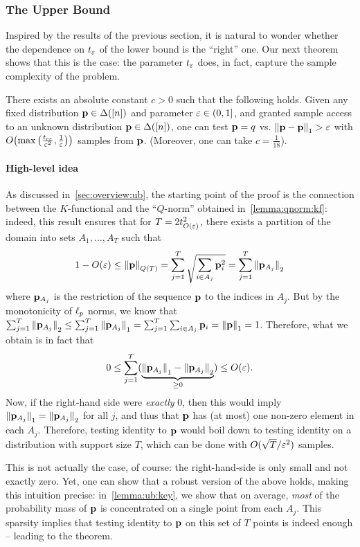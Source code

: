 \subsubsection{The Upper Bound}\label{sec:id:ub}
Inspired by the results of the previous section, it is natural to wonder whether the dependence on $t_\eps$ of the lower bound is the ``right'' one. Our next theorem shows that this is the case: the parameter $t_\eps$ does, in fact, capture the sample complexity of the problem.
\begin{theorem}\label{theo:id:ub}
  There exists an absolute constant $c>0$ such that the following holds. Given any fixed distribution $\p\in\distribs{[n]}$ and parameter $\eps\in(0,1]$, and granted sample access to an unknown distribution $\q\in\distribs{[n]}$, one can test $\p=q$ vs. $\normone{\p-\q} > \eps$ with $\bigO{ \max\left(\frac{t_{c\eps}}{\eps^{2}},\frac{1}{\eps}\right) }$ samples from $\q$. (Moreover, one can take $c=\frac{1}{18}$).
\end{theorem}

\paragraph{High-level idea}
As discussed in~\cref{sec:overview:ub}, the starting point of the proof is the connection between the $K$-functional and the ``$Q$-norm'' obtained in~\cref{lemma:qnorm:kf}: indeed, this result ensures that for $T=2t^2_{O(\eps)}$, there exists a partition of the domain into sets $A_1,\dots,A_T$ such that
\[
      1-O(\eps) \leq \norm{\p}_{Q(T)} = \sum_{j=1}^T \sqrt{ \sum_{i\in A_j} \p_i^2 } = \sum_{j=1}^T \normtwo{ \p_{A_j} }
\]
where $\p_{A_j}$ is the restriction of the sequence $\p$ to the indices in $A_j$. But by the monotonicity of $\lp[p]$ norms, we know that 
$\sum_{j=1}^T \normtwo{ \p_{A_j} } \leq \sum_{j=1}^T \normone{ \p_{A_j} } = \sum_{j=1}^T\sum_{i\in A_j} \p_i = \normone{\p}=1$. Therefore, what we obtain is in fact that
\[
      0 \leq \sum_{j=1}^T (\underbrace{ \normone{ \p_{A_j} } - \normtwo{ \p_{A_j} } }_{\geq 0}) \leq O(\eps).
\]
Now, if the right-hand side were \emph{exactly} 0, then this would imply $\normone{ \p_{A_j} } = \normtwo{ \p_{A_j} }$ for all $j$, and thus that $\p$ has (at most) one non-zero element in each $A_j$. Therefore, testing identity to $\p$ would boil down to testing identity on a distribution with support size $T$, which can be done with $O(\sqrt{T}/\eps^2)$ samples.

This is not actually the case, of course: the right-hand-side is only small and not exactly zero. Yet, one can show that a robust version of the above holds, making this intuition precise: in~\cref{lemma:ub:key}, we show that on average, \emph{most} of the probability mass of $\p$ is concentrated on a single point from each $A_j$. This sparsity implies that testing identity to $\p$ on this set of $T$ points is indeed enough -- leading to the theorem.

